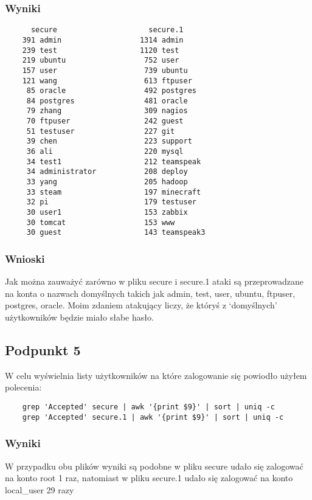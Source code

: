 \documentclass{article}
\begin{document}
\subsubsection{Wyniki}
\begin{verbatim}
      secure                     secure.1
    391 admin                  1314 admin
    239 test                   1120 test
    219 ubuntu                  752 user
    157 user                    739 ubuntu
    121 wang                    613 ftpuser
     85 oracle                  492 postgres
     84 postgres                481 oracle
     79 zhang                   309 nagios
     70 ftpuser                 242 guest
     51 testuser                227 git
     39 chen                    223 support
     36 ali                     220 mysql
     34 test1                   212 teamspeak
     34 administrator           208 deploy
     33 yang                    205 hadoop
     33 steam                   197 minecraft
     32 pi                      179 testuser
     30 user1                   153 zabbix
     30 tomcat                  153 www
     30 guest                   143 teamspeak3
\end{verbatim}
\subsubsection{Wnioski}
Jak można zauważyć zarówno w pliku secure i secure.1 ataki są przeprowadzane na konta o nazwach domyślnych takich jak admin, test, user, ubuntu, ftpuser, postgres, oracle. Moim zdaniem atakujący liczy, że któryś z `domyślnych' użytkowników będzie miało słabe hasło.
\subsection{Podpunkt 5}
W celu wyświelnia listy użytkowników na które zalogowanie się powiodło użyłem polecenia:
\begin{verbatim}
    grep 'Accepted' secure | awk '{print $9}' | sort | uniq -c
    grep 'Accepted' secure.1 | awk '{print $9}' | sort | uniq -c
\end{verbatim}

\subsubsection{Wyniki}
W przypadku obu plików wyniki są podobne w pliku secure udało się zalogować na konto root 1 raz, natomiast w pliku secure.1 udało się zalogować na konto local\_user 29 razy
\end{document}
